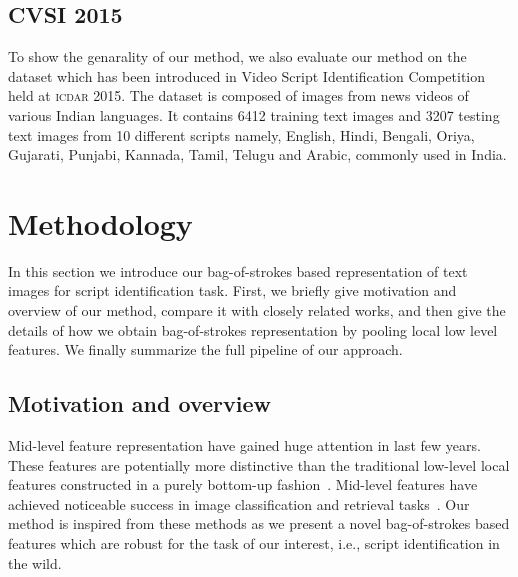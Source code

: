 \subsection{CVSI 2015~\cite{CVSIComp}}
To show the genarality of our method, we also evaluate our method on the dataset which has been introduced in Video Script Identification Competition held at \textsc{icdar 2015}.  
The dataset is composed of images from news videos of various Indian
languages. It contains 6412 training text images and 3207 testing text images from 10 different scripts
namely, English, Hindi, Bengali, Oriya, Gujarati, Punjabi, Kannada,
Tamil, Telugu and Arabic, commonly used in India.

\section{Methodology}
\label{sec:ourApp}
In this section we introduce our bag-of-strokes based representation of text images for script identification task. First, we briefly give motivation and overview of our method, compare it with closely related works, and then give the details of how we obtain bag-of-strokes representation by pooling local low level features. We finally summarize the full pipeline of our approach.

\subsection{Motivation and overview}
Mid-level feature representation have gained huge attention in last few years. These features are potentially more distinctive than the traditional low-level local features constructed in a purely bottom-up fashion~\cite{FernandoFT14}. Mid-level features have achieved noticeable success in image classification and retrieval tasks~\cite{JunejaVJZ13,BoureauBLP10,FernandoFT14}. Our method is inspired from these methods as we present a novel bag-of-strokes based features which are robust for the task of our interest, i.e., script identification in the wild. 

